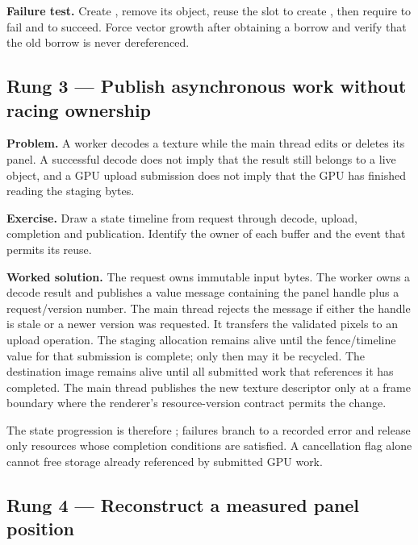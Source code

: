 \textbf{Failure test.} Create , remove its object, reuse the slot to create , then require  to fail and  to succeed. Force vector growth after obtaining a borrow and verify that the old borrow is never dereferenced.

\subsection{Rung 3 --- Publish asynchronous work without racing ownership}\label{02-foundations-ii-ch038-rung-3-publish-asynchronous-work-without-racing-ownership}

\hypertarget{02-foundations-ii-ch038-rung-3-publish-asynchronous-work-without-racing-ownership}{}

\textbf{Problem.} A worker decodes a texture while the main thread edits or deletes its panel. A successful decode does not imply that the result still belongs to a live object, and a GPU upload submission does not imply that the GPU has finished reading the staging bytes.

\textbf{Exercise.} Draw a state timeline from request through decode, upload, completion and publication. Identify the owner of each buffer and the event that permits its reuse.

\textbf{Worked solution.} The request owns immutable input bytes. The worker owns a decode result and publishes a value message containing the panel handle plus a request/version number. The main thread rejects the message if either the handle is stale or a newer version was requested. It transfers the validated pixels to an upload operation. The staging allocation remains alive until the fence/timeline value for that submission is complete; only then may it be recycled. The destination image remains alive until all submitted work that references it has completed. The main thread publishes the new texture descriptor only at a frame boundary where the renderer's resource-version contract permits the change.

The state progression is therefore ; failures branch to a recorded error and release only resources whose completion conditions are satisfied. A cancellation flag alone cannot free storage already referenced by submitted GPU work.

\subsection{Rung 4 --- Reconstruct a measured panel position}\label{02-foundations-ii-ch038-rung-4-reconstruct-a-measured-panel-position}


